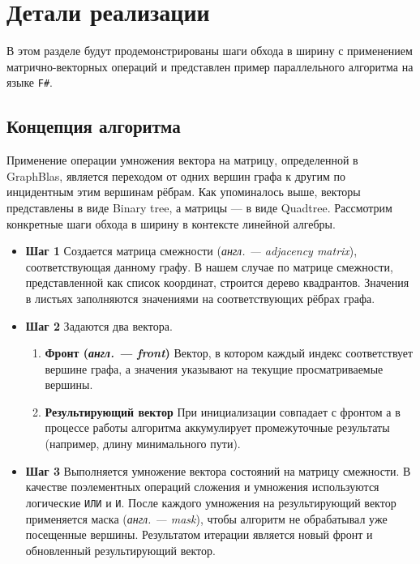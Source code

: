 
\section{Детали реализации}
\noindent В этом разделе будут продемонстрированы шаги обхода в ширину с применением матрично-векторных операций и представлен пример параллельного алгоритма на языке \texttt{F\#}.



\subsection{Концепция алгоритма}
\noindent Применение операции умножения вектора на матрицу, определенной в GraphBlas, является переходом от одних вершин графа к другим по инцидентным этим вершинам рёбрам.
Как упоминалось выше, векторы представлены в виде Binary tree, а матрицы --- в виде Quadtree. Рассмотрим конкретные шаги обхода в ширину в контексте линейной алгебры.
\begin{itemize}
    \item{\textbf{Шаг 1}} \newline Создается матрица смежности (\textit{англ. --- adjacency matrix}), соответствующая данному графу. В нашем случае по матрице смежности, представленной как список координат, строится дерево квадрантов. Значения в листьях заполняются значениями на соответствующих рёбрах графа.
    \item{\textbf{Шаг 2}} \newline Задаются два вектора.
    \begin{enumerate}
        \item{\textbf{Фронт (\textit{англ. --- front})}} \newline Вектор, в котором каждый индекс соответствует вершине графа, а значения указывают на текущие просматриваемые вершины.
        \item{\textbf{Результирующий вектор}} \newline 
        При инициализации совпадает с фронтом а в процессе работы алгоритма аккумулирует промежуточные результаты (например, длину минимального пути).
    \end{enumerate}
    \item{\textbf{Шаг 3}} \newline Выполняется умножение вектора состояний на матрицу смежности. В качестве поэлементных операций сложения и умножения используются логические \texttt{ИЛИ} и \texttt{И}. После каждого умножения на результирующий вектор применяется маска (\textit{англ. --- mask}), чтобы алгоритм не обрабатывал уже посещенные вершины. Результатом итерации является новый фронт и обновленный результирующий вектор.
\end{itemize}

